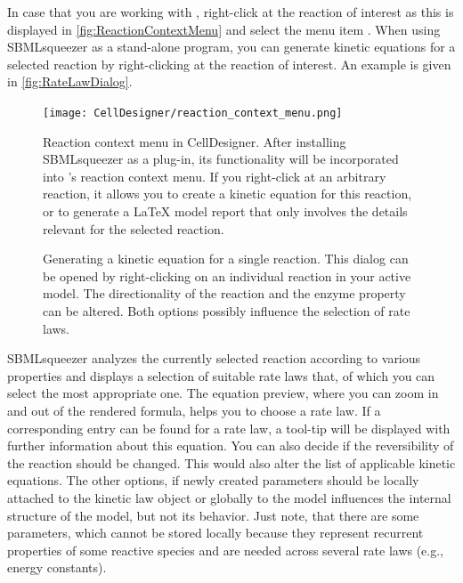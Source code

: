 In case that you are working with \CellDesigner, right-click at the reaction of interest as this is displayed in \vref{fig:ReactionContextMenu} and select the menu item .
When using SBMLsqueezer as a stand-alone program, you can generate kinetic equations for a selected reaction by right-clicking at the reaction of interest.
An example is given in \vref{fig:RateLawDialog}.
\begin{figure}
\texttt{[image: CellDesigner/reaction\_context\_menu.png]}
\caption{Reaction context menu in CellDesigner.
After installing SBMLsqueezer as a plug-in, its functionality will be incorporated into \CellDesigner's reaction context menu.
If you right-click at an arbitrary reaction, it allows you to create a kinetic equation for this reaction, or to generate a \LaTeX{} model report that only involves the details relevant for the selected reaction.}
\label{fig:ReactionContextMenu}
\end{figure}
\begin{figure}[b!]
\caption{Generating a kinetic equation for a single reaction.
This dialog can be opened by right-clicking on an individual reaction in your active model.
The directionality of the reaction and the enzyme property can be altered.
Both options possibly influence the selection of rate laws.}
\label{fig:RateLawDialog}
\end{figure}
SBMLsqueezer analyzes the currently selected reaction according to various properties
and displays a selection of suitable rate laws that, of which you can select
the most appropriate one. The equation preview, where you can zoom in and out
of the rendered formula, helps you to choose a rate law. If a corresponding
\SBO entry can be found for a rate law, a tool-tip will be displayed with further
information about this equation.
You can also decide if the reversibility of the reaction should be changed.
This would also alter the list of applicable kinetic equations.
The other options, if newly created
parameters should be locally attached to the kinetic law object or globally to
the model influences the internal structure of the model, but not its behavior.
Just note, that there are some parameters, which cannot be stored locally because
they represent recurrent properties of some reactive species and are needed
across several rate laws (e.g., energy constants).

